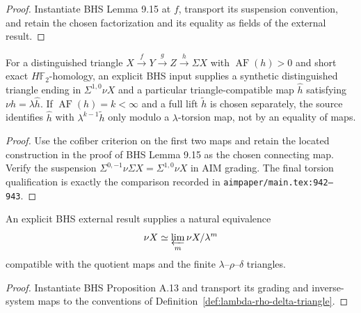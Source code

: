 \begin{proof}
  Instantiate BHS Lemma 9.15 at $f$, transport its suspension convention, and
  retain the chosen factorization and its equality as fields of the external
  result.
\end{proof}

\begin{theorem}
  \label{thm:external-synthetic-triangle-lift}
  \notready
  For a distinguished triangle
  $X\xrightarrow fY\xrightarrow gZ\xrightarrow h\Sigma X$ with
  $\operatorname{AF}(h)>0$ and short exact $H\mathbb F_2$-homology, an
  explicit BHS input supplies a synthetic distinguished triangle ending in
  $\Sigma^{1,0}\nu X$ and a particular triangle-compatible map $\widehat h$
  satisfying $\nu h=\lambda\widehat h$.  If
  $\operatorname{AF}(h)=k<\infty$ and a full lift $\widetilde h$ is chosen
  separately, the source identifies $\widehat h$ with
  $\lambda^{k-1}\widetilde h$ only modulo a $\lambda$-torsion map, not by an
  equality of maps.
\end{theorem}

\begin{proof}
  Use the cofiber criterion on the first two maps and retain the located
  construction in the proof of BHS Lemma 9.15 as the chosen connecting map.
  Verify the suspension
  $\Sigma^{0,-1}\nu\Sigma X=\Sigma^{1,0}\nu X$ in AIM grading.  The final
  torsion qualification is exactly the comparison recorded in
  \texttt{aimpaper/main.tex:942--943}.
\end{proof}

\begin{theorem}
  \label{thm:external-synthetic-lambda-complete}
  \notready
  An explicit BHS external result supplies a natural equivalence
  \[
    \nu X\simeq\varprojlim_m\nu X/\lambda^m
  \]
  compatible with the quotient maps and the finite
  $\lambda$--$\rho$--$\delta$ triangles.
\end{theorem}

\begin{proof}
  Instantiate BHS Proposition A.13 and transport its grading and inverse-system
  maps to the conventions of Definition~\ref{def:lambda-rho-delta-triangle}.
\end{proof}

